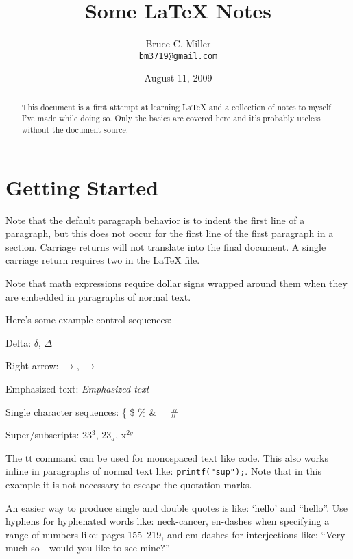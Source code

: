 \documentclass[a4paper,12pt]{article}
\begin{document}
\title{Some \LaTeX{} Notes}
\author{Bruce C. Miller \\
{\tt bm3719@gmail.com}}
\date{August 11, 2009}
\maketitle

\begin{abstract}
  This document is a first attempt at learning \LaTeX{} and a collection of
  notes to myself I've made while doing so.  Only the basics are covered here
  and it's probably useless without the document source.
\end{abstract}

\tableofcontents 
\setcounter{tocdepth}{2}

\section{Getting Started}

Note that the default paragraph behavior is to indent the first line of a
paragraph, but this does not occur for the first line of the first paragraph in
a section.  Carriage returns will not translate into the final document.  A
single carriage return requires two in the \LaTeX{} file.

Note that math expressions require dollar signs wrapped around them when they
are embedded in paragraphs of normal text.  

Here's some example control sequences:

\vspace{20pt}
Delta: $\delta$, $\Delta$

Right arrow: $\to$, $\rightarrow$

Emphasized text: \emph{Emphasized text}

Single character sequences: \{ \" \$ \% \& \_ \#

Super/subscripts: 23$^3$, 23$_a$, x$^{2y}$
\vspace{20pt}


The tt command can be used for monospaced text like code.  This also works
inline in paragraphs of normal text like: {\tt printf("sup");}. Note that in
this example it is not necessary to escape the quotation marks.

An easier way to produce single and double quotes is like: `hello' and
``hello''.  Use hyphens for hyphenated words like: neck-cancer, en-dashes
when specifying a range of numbers like: pages 155--219, and em-dashes for
interjections like: ``Very much so---would you like to see mine?''
\end{document}
